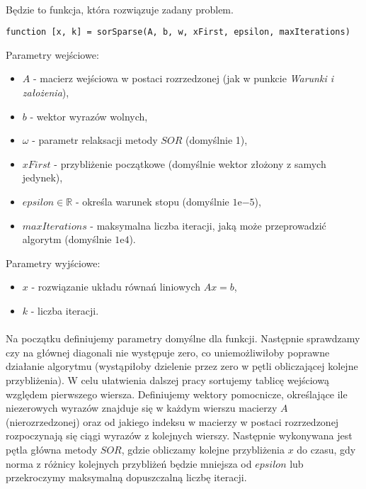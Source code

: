 \documentclass{article}
\begin{document}
\paragraph{}
Będzie to funkcja, która rozwiązuje zadany problem.
\begin{lstlisting}[style=Matlab-editor]
function [x, k] = sorSparse(A, b, w, xFirst, epsilon, maxIterations)
\end{lstlisting}
\vspace{4pt}
Parametry wejściowe:
\begin{itemize}
\item $A$ - macierz wejściowa w postaci rozrzedzonej (jak w punkcie \textit{Warunki i założenia}),
\item $b$ - wektor wyrazów wolnych,
\item $\omega$ - parametr relaksacji metody $SOR$ (domyślnie 1),
\item $xFirst$ - przybliżenie początkowe (domyślnie wektor złożony z samych jedynek),
\item $epsilon\in \mathbb{R}$ - określa warunek stopu (domyślnie $1\mathrm{e}{-5}$),
\item $maxIterations$ - maksymalna liczba iteracji, jaką może przeprowadzić algorytm (domyślnie $1\mathrm{e}{4}$).
\end{itemize}
Parametry wyjściowe:
\begin{itemize}
\item$x$ - rozwiązanie układu równań liniowych $Ax = b$,
\item$ k$ - liczba iteracji.
\end{itemize}
\paragraph{}
Na początku definiujemy parametry domyślne dla funkcji. Następnie sprawdzamy czy na głównej diagonali nie występuje zero, co uniemożliwiłoby poprawne działanie algorytmu (wystąpiłoby dzielenie przez zero w pętli obliczającej kolejne przybliżenia). W celu ułatwienia dalszej pracy sortujemy tablicę wejściową względem pierwszego wiersza. Definiujemy wektory pomocnicze, określające ile niezerowych wyrazów znajduje się w każdym wierszu macierzy $A$ (nierozrzedzonej) oraz od jakiego indeksu w macierzy w postaci rozrzedzonej rozpoczynają się ciągi wyrazów z kolejnych wierszy. Następnie wykonywana jest pętla główna metody $SOR$, gdzie obliczamy kolejne przybliżenia $x$ do czasu, gdy norma z różnicy kolejnych przybliżeń będzie mniejsza od $epsilon$ lub przekroczymy maksymalną dopuszczalną liczbę iteracji.
\end{document}
